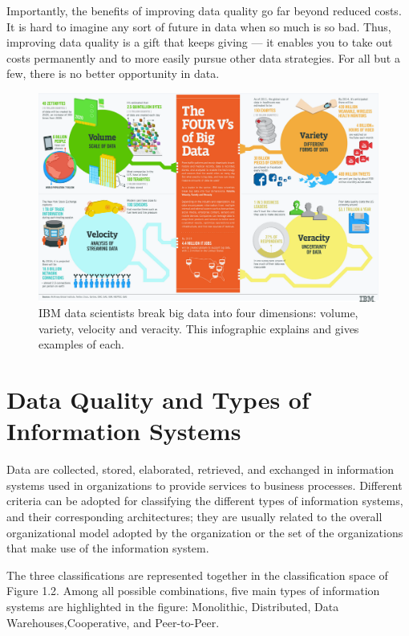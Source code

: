 Importantly, the benefits of improving data quality go far beyond reduced costs. It is hard to imagine any sort of future in data when so much is so bad. Thus, improving data quality is a gift that keeps giving — it enables you to take out costs permanently and to more easily pursue other data strategies. 
For all but a few, there is no better opportunity in data.

\begin{figure}[H]
    \centering
    \includegraphics[angle=-90,scale=.3]{4-Vs-of-big-data}
    \caption{IBM data scientists break big data into four dimensions: volume, variety, velocity and veracity. This infographic explains and gives examples of each. ~\cite{ibmInfoGraphic}}
\end{figure}

\section{Data Quality and Types of Information Systems}

Data are collected, stored, elaborated, retrieved, and exchanged in information systems used in organizations to provide services to business processes.
Different criteria can be adopted for classifying the different types of information systems, and their corresponding architectures; they are usually related to
the overall organizational model adopted by the organization or the set of the
organizations that make use of the information system.

The three classifications are represented together in the classification space of Figure 1.2.
Among all possible combinations, five main types of information systems are highlighted in the figure:
Monolithic, Distributed, Data Warehouses,Cooperative, and Peer-to-Peer.


